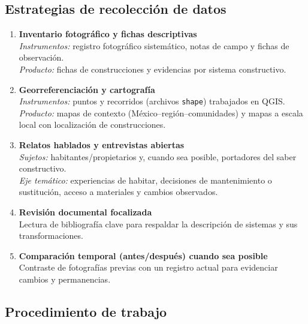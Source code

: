 \subsection{Estrategias de recolección de datos}

\vspace{-0.5em}
\begin{enumerate}
	\item \textbf{Inventario fotográfico y fichas descriptivas}\\
	      \textit{Instrumentos:} registro fotográfico sistemático, notas de campo y fichas de observación.\\
	      \textit{Producto:} fichas de construcciones y evidencias por sistema constructivo.
	\item \textbf{Georreferenciación y cartografía}\\
	      \textit{Instrumentos:} puntos y recorridos (archivos \texttt{shape}) trabajados en QGIS.\\
	      \textit{Producto:} mapas de contexto (México--región--comunidades) y mapas a escala local con localización de construcciones.
	\item \textbf{Relatos hablados y entrevistas abiertas}\\
	      \textit{Sujetos:} habitantes/propietarios y, cuando sea posible, portadores del saber constructivo. \\
	      \textit{Eje temático:} experiencias de habitar, decisiones de mantenimiento o sustitución, acceso a materiales y cambios observados.
	\item \textbf{Revisión documental focalizada}\\
	      Lectura de bibliografía clave para respaldar la descripción de sistemas y sus transformaciones.
	\item \textbf{Comparación temporal (antes/después) cuando sea posible}\\
	      Contraste de fotografías previas con un registro actual para evidenciar cambios y permanencias.
\end{enumerate}

\subsection{Procedimiento de trabajo}

